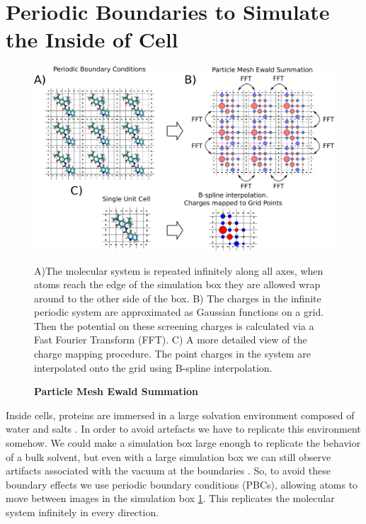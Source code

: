 \section{Periodic Boundaries to Simulate the Inside of Cell}
\begin{figure}
	\begin{center}
		\includegraphics[width=\textwidth]{figures/PME_miro.pdf}
	\end{center}
	\captionsetup{singlelinecheck = false, justification=raggedright}
	\caption[Particle Mesh Ewald Summation] {\textbf{Particle Mesh Ewald Summation}}{A)The molecular system is repeated infinitely along all axes, when atoms reach the edge of the simulation box they are allowed wrap around to the other side of the box. B) The charges in the infinite periodic system are approximated as Gaussian functions on a grid. Then the potential on these screening charges is calculated via a Fast Fourier Transform (FFT). C) A more detailed view of the charge mapping procedure. The point charges in the system are interpolated onto the grid using B-spline interpolation. }
	\label{PME_illustration}
\end{figure}

Inside cells, proteins are immersed in a large solvation environment composed of water and salts \cite{phillips2012}. In order to avoid artefacts we have to replicate this environment somehow\cite{ross2018}. We could make a simulation box large enough to replicate the behavior of a bulk solvent, but even with a large simulation box we can still observe artifacts associated with the vacuum at the boundaries \cite{gapsys2020}. So, to avoid these boundary effects we use periodic boundary conditions (PBCs), allowing atoms to move between images in the simulation box \ref{PME_illustration}. This replicates the molecular system infinitely in every direction. 

